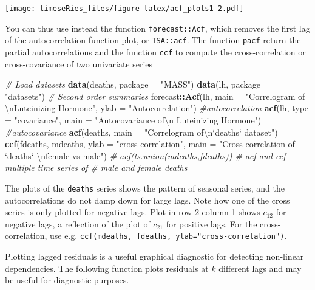 \documentclass[]{book}
\newenvironment{Shaded}{\begin{snugshade}}{\end{snugshade}}
\newcommand{\KeywordTok}[1]{\textcolor[rgb]{0.13,0.29,0.53}{\textbf{#1}}}
\newcommand{\DataTypeTok}[1]{\textcolor[rgb]{0.13,0.29,0.53}{#1}}
\newcommand{\CharTok}[1]{\textcolor[rgb]{0.31,0.60,0.02}{#1}}
\newcommand{\StringTok}[1]{\textcolor[rgb]{0.31,0.60,0.02}{#1}}
\newcommand{\CommentTok}[1]{\textcolor[rgb]{0.56,0.35,0.01}{\textit{#1}}}
\newcommand{\OperatorTok}[1]{\textcolor[rgb]{0.81,0.36,0.00}{\textbf{#1}}}
\newcommand{\NormalTok}[1]{#1}
\begin{document}
\texttt{[image: timeseRies\_files/figure-latex/acf\_plots1-2.pdf]}

You can thus use instead the function \texttt{forecast::Acf}, which
removes the first lag of the autocorrelation function plot, or
\texttt{TSA::acf}. The function \texttt{pacf} return the partial
autocorrelations and the function \texttt{ccf} to compute the
cross-correlation or cross-covariance of two univariate series

\begin{Shaded}
\begin{Highlighting}[]
\CommentTok{# Load datasets}
\KeywordTok{data}\NormalTok{(deaths, }\DataTypeTok{package =} \StringTok{"MASS"}\NormalTok{)}
\KeywordTok{data}\NormalTok{(lh, }\DataTypeTok{package =} \StringTok{"datasets"}\NormalTok{)}
\CommentTok{# Second order summaries}
\NormalTok{forecast}\OperatorTok{::}\KeywordTok{Acf}\NormalTok{(lh, }\DataTypeTok{main =} \StringTok{"Correlogram of }\CharTok{\textbackslash{}n}\StringTok{Luteinizing Hormone"}\NormalTok{, }\DataTypeTok{ylab =} \StringTok{"Autocorrelation"}\NormalTok{)  }\CommentTok{#autocorrelation}
\KeywordTok{acf}\NormalTok{(lh, }\DataTypeTok{type =} \StringTok{"covariance"}\NormalTok{, }\DataTypeTok{main =} \StringTok{"Autocovariance of}\CharTok{\textbackslash{}n}\StringTok{ Luteinizing Hormone"}\NormalTok{)  }\CommentTok{#autocovariance}
\KeywordTok{acf}\NormalTok{(deaths, }\DataTypeTok{main =} \StringTok{"Correlogram of}\CharTok{\textbackslash{}n}\StringTok{`deaths` dataset"}\NormalTok{)}
\KeywordTok{ccf}\NormalTok{(fdeaths, mdeaths, }\DataTypeTok{ylab =} \StringTok{"cross-correlation"}\NormalTok{, }\DataTypeTok{main =} \StringTok{"Cross correlation of `deaths` }\CharTok{\textbackslash{}n}\StringTok{female vs male"}\NormalTok{)}
\CommentTok{# acf(ts.union(mdeaths,fdeaths)) # acf and ccf - multiple time series of}
\CommentTok{# male and female deaths}
\end{Highlighting}
\end{Shaded}

The plots of the \texttt{deaths} series shows the pattern of seasonal
series, and the autocorrelations do not damp down for large lags. Note
how one of the cross series is only plotted for negative lags. Plot in
row 2 column 1 shows \(c_{12}\) for negative lags, a reflection of the
plot of \(c_{21}\) for positive lags. For the cross-correlation, use
e.g. \texttt{ccf(mdeaths,\ fdeaths,\ ylab="cross-correlation")}.

Plotting lagged residuals is a useful graphical diagnostic for detecting
non-linear dependencies. The following function plots residuals at \(k\)
different lags and may be useful for diagnostic purposes.
\end{document}
